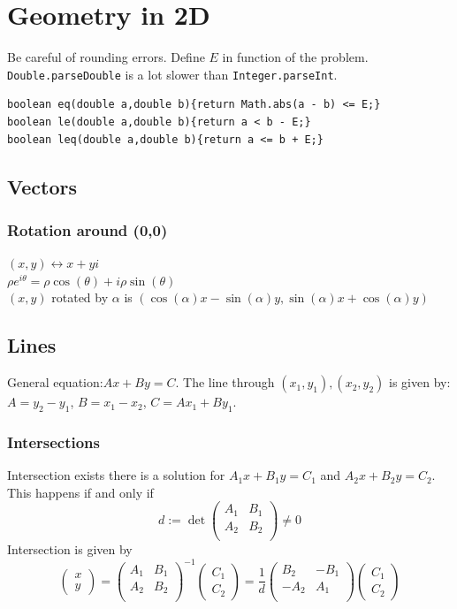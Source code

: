 \section{Geometry in 2D}
Be careful of rounding errors. Define $E$ in function of the problem.
\lstinline|Double.parseDouble| is a lot slower than \lstinline|Integer.parseInt|.
\begin{lstlisting}
boolean eq(double a,double b){return Math.abs(a - b) <= E;}
boolean le(double a,double b){return a < b - E;}
boolean leq(double a,double b){return a <= b + E;}
\end{lstlisting}
\subsection{Vectors}
\subsubsection{Rotation around (0,0)}
$(x, y) \leftrightarrow x + y i$\\
$\rho e^{i\theta} = \rho \cos(\theta) + i \rho \sin(\theta)$\\

$(x, y)$ rotated by $\alpha$ is
$(\cos(\alpha) x - \sin(\alpha) y, \sin(\alpha)  x + \cos(\alpha) y)$


\subsection{Lines}
General equation:$Ax + By = C$. The line through $(x_1, y_1), (x_2, y_2)$ is given by: $A = y_2 - y_1$, $B = x_1 - x_2$, $C = A x_1 + B y_1$.
\subsubsection{Intersections}
Intersection exists there is a solution for $A_1 x + B_1 y = C_1$ and $A_2 x + B_2 y = C_2$. This happens if and only if $$d := \det \begin{pmatrix}
A_1 & B_1 \\
A_2 & B_2 \\
\end{pmatrix} \neq 0$$
Intersection is given by
$$\begin{pmatrix}
x\\
y
\end{pmatrix} = 
\begin{pmatrix}
A_1 & B_1 \\
A_2 & B_2 \\
\end{pmatrix}^{-1} 
\begin{pmatrix}
C_1 \\
C_2
\end{pmatrix}
=
\frac{1}{d}
\begin{pmatrix}
B_2 & -B_1 \\
-A_2 & A_1 \\
\end{pmatrix} 
\begin{pmatrix}
C_1 \\
C_2
\end{pmatrix}
$$
